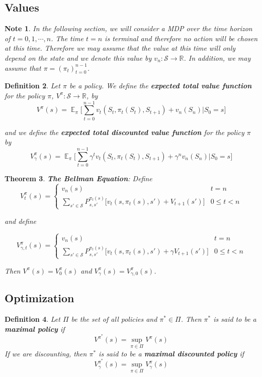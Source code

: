 \documentclass[12pt]{amsart}
\newtheorem{thm}{Theorem}[section]
\newtheorem{defn}[thm]{Definition}
\newtheorem{note}[thm]{Note}
\newcommand{\gam}{\gamma}
\newcommand{\R}{\mathbb{R}}
\newcommand{\MS}{\mathcal{S}}
\DeclareMathOperator*{\E}{\mathbb{E}}
\begin{document}
\subsection{Values}
\begin{note}
In the following section, we will consider a MDP over the time horizon of $t=0,1, \cdots, n$. The time $t = n$ is terminal and therefore no action will be chosen at this time. Therefore we may assume that the value at this time will only depend on the state and we denote this value by $v_n:\MS \rightarrow \R$. In addition, we may assume that $\pi = (\pi_t)_{t=0}^{n-1}$.
\end{note}
\begin{defn} 
Let $\pi$ be a policy. We define the \textbf{expected total value function} for the policy $\pi$, $V^{\pi}: \MS \rightarrow \R$, by $$V^{\pi}(s) = \E_{\pi}\bigg[\sum_{t =0}^{n-1} v_t(S_t, \pi_t(S_t), S_{t+1})+ v_n(S_n)|S_0=s\bigg]$$

and we define the \textbf{expected total discounted value function} for the policy $\pi$ by $$V^{\pi}_\gam (s) = \E_{\pi}\bigg[\sum_{t =0}^{n-1} \gam^t v_t(S_t, \pi_t(S_t), S_{t+1}) + \gam^n v_n(S_n)|S_0=s\bigg]$$
\end{defn}

\begin{thm}{\textbf{The Bellman Equation}:}
Define 
\[ V_t^{\pi}(s) = 
\begin{cases}
v_n(s) & t = n \\
\sum\limits_{s' \in \MS} P^{\pi_t(s)}_{s, s'}\bigg[v_t(s, \pi_t(s), s') + V_{t+1}(s')\bigg] & 0 \leq t < n
\end{cases}
\]

and define 

\[ V_{\gam, t}^{\pi}(s) = 
\begin{cases}
v_n(s) & t = n \\
\sum\limits_{s' \in \MS} P^{\pi_t(s)}_{s, s'}\bigg[v_t(s, \pi_t(s), s') + \gam V_{t+1}(s')\bigg] & 0 \leq t < n
\end{cases}
\]

Then $V^{\pi}(s) = V_0^{\pi}(s)$ and $V_\gam ^{\pi}(s) = V_{\gam, 0}^{\pi}(s)$.
\end{thm}

\subsection{Optimization}

\begin{defn}
Let $\Pi$ be the set of all policies and $\pi^* \in \Pi$. Then $\pi^*$ is said to be a \textbf{maximal policy} if$$V^{\pi^*}(s) = \sup_{\pi \in \Pi}V^{\pi}(s)$$ If we are discounting, then $\pi^*$ is said to be a \textbf{maximal discounted policy} if $$V_{\gam}^{\pi^*}(s) = \sup_{\pi \in \Pi}V_{\gam}^{\pi}(s)$$ 
\end{defn}
\end{document}
